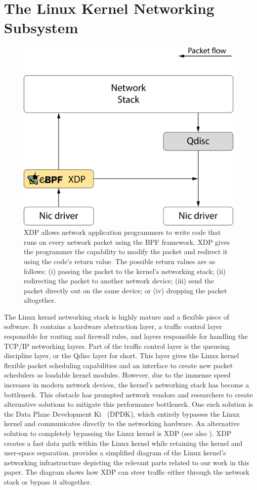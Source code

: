 \documentclass[sigconf, nonacm]{acmart}
\begin{document}

\section{The Linux Kernel Networking Subsystem}

\begin{figure}
  \includegraphics[width=0.6\linewidth]{network-overview.pdf}
  \caption{XDP allows network application programmers to write code that runs on every network packet using the BPF framework. XDP gives the programmer the capability to modify the packet and redirect it using the code's return value. The possible return values are as follows: (i) passing the packet to the kernel's networking stack; (ii) redirecting the packet to another network device; (iii) send the packet directly out on the same device; or (iv) dropping the packet altogether.}
  \label{fig:network_overview}
\end{figure}

The Linux kernel networking stack is highly mature and a flexible piece of software. It contains a hardware abstraction layer, a traffic control layer responsible for routing and firewall rules, and layers responsible for handling the TCP/IP networking layers. Part of the traffic control layer is the queueing discipline layer, or the Qdisc layer for short. This layer gives the Linux kernel flexible packet scheduling capabilities and an interface to create new packet schedulers as loadable kernel modules. However, due to the immense speed increases in modern network devices, the kernel's networking stack has become a bottleneck. This obstacle has prompted network vendors and researchers to create alternative solutions to mitigate this performance bottleneck. One such solution is the Data Plane Development Ki~\cite{dpdk} (DPDK), which entirely bypasses the Linux kernel and communicates directly to the networking hardware. An alternative solution to completely bypassing the Linux kernel is XDP (see also ). XDP creates a fast data path within the Linux kernel while retaining the kernel and user-space separation.  provides a simplified diagram of the Linux kernel's networking infrastructure depicting the relevant parts related to our work in this paper. The diagram shows how XDP can steer traffic either through the network stack or bypass it altogether.
\end{document}
